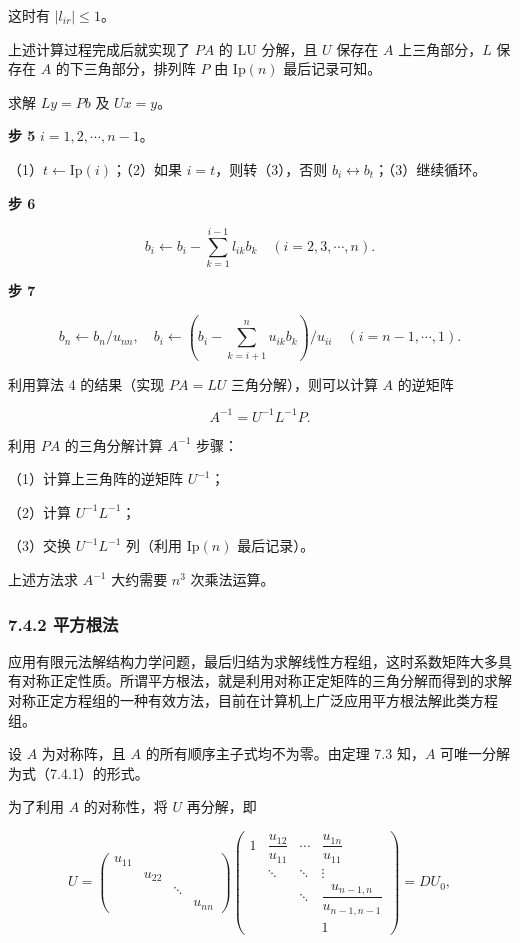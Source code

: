 \documentclass[
  10pt,
  fontset=fandol]{ctexart}
\begin{document}
这时有 \(|l_{ir}|\le1\)。

上述计算过程完成后就实现了 \(PA\) 的 LU 分解，且 \(U\) 保存在 \(A\) 上三角部分，\(L\) 保存在 \(A\) 的下三角部分，排列阵 \(P\) 由 \(\mathrm{Ip}(n)\) 最后记录可知。

求解 \(Ly=Pb\) 及 \(Ux=y\)。

\textbf{步 5} \(i=1,2,\cdots,n-1\)。

（1）\(t\leftarrow\mathrm{Ip}(i)\)；（2）如果 \(i=t\)，则转（3），否则 \(b_i\leftrightarrow b_t\)；（3）继续循环。

\textbf{步 6}

\[b_i\leftarrow b_i-\sum_{k=1}^{i-1}l_{ik}b_k\quad(i=2,3,\cdots,n).\]

\textbf{步 7}

\[b_n\leftarrow b_n/u_{nn},\quad b_i\leftarrow\left(b_i-\sum_{k=i+1}^{n}u_{ik}b_k\right)/u_{ii}\quad(i=n-1,\cdots,1).\]

利用算法 4 的结果（实现 \(PA=LU\) 三角分解），则可以计算 \(A\) 的逆矩阵

\[A^{-1}=U^{-1}L^{-1}P.\]

利用 \(PA\) 的三角分解计算 \(A^{-1}\) 步骤：

（1）计算上三角阵的逆矩阵 \(U^{-1}\)；

（2）计算 \(U^{-1}L^{-1}\)；

（3）交换 \(U^{-1}L^{-1}\) 列（利用 \(\mathrm{Ip}(n)\) 最后记录）。

上述方法求 \(A^{-1}\) 大约需要 \(n^3\) 次乘法运算。

\subsubsection{7.4.2 平方根法}\label{ux5e73ux65b9ux6839ux6cd5}

应用有限元法解结构力学问题，最后归结为求解线性方程组，这时系数矩阵大多具有对称正定性质。所谓平方根法，就是利用对称正定矩阵的三角分解而得到的求解对称正定方程组的一种有效方法，目前在计算机上广泛应用平方根法解此类方程组。

设 \(A\) 为对称阵，且 \(A\) 的所有顺序主子式均不为零。由定理 7.3 知，\(A\) 可唯一分解为式（7.4.1）的形式。

为了利用 \(A\) 的对称性，将 \(U\) 再分解，即

\[
U=\begin{pmatrix}
u_{11}&&&\\
&u_{22}&&\\
&&\ddots&\\
&&&u_{nn}
\end{pmatrix}
\begin{pmatrix}
1&\dfrac{u_{12}}{u_{11}}&\cdots&\dfrac{u_{1n}}{u_{11}}\\
&\ddots&\ddots&\vdots\\
&&\ddots&\dfrac{u_{n-1,n}}{u_{n-1,n-1}}\\
&&&1
\end{pmatrix}=DU_0,
\]
\end{document}
